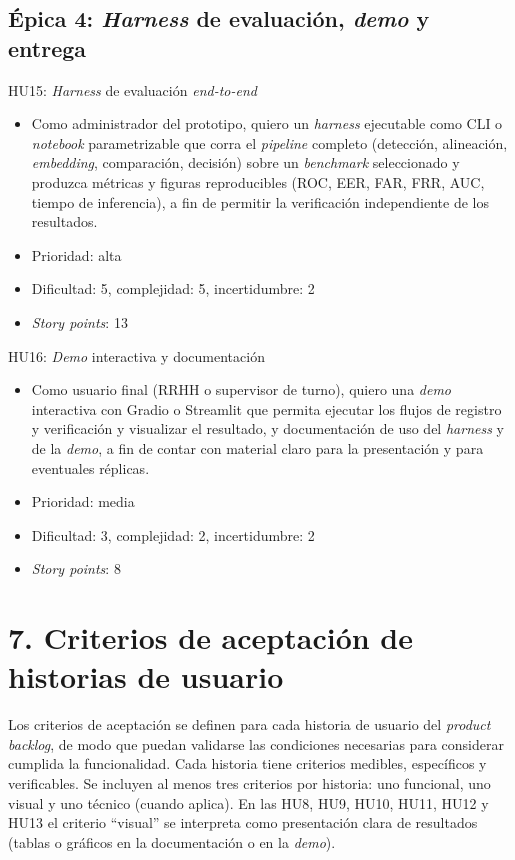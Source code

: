 \documentclass[
  11pt, %
]{charter}
\begin{document}
\subsection{Épica 4: \textit{Harness} de evaluación, \textit{demo} y entrega}

HU15: \textit{Harness} de evaluación \textit{end-to-end}
\begin{itemize}
  \item Como administrador del prototipo, quiero un \textit{harness} ejecutable como CLI o \textit{notebook} parametrizable que corra el \textit{pipeline} completo (detección, alineación, \textit{embedding}, comparación, decisión) sobre un \textit{benchmark} seleccionado y produzca métricas y figuras reproducibles (ROC, EER, FAR, FRR, AUC, tiempo de inferencia), a fin de permitir la verificación independiente de los resultados.
  \item Prioridad: alta
  \item Dificultad: 5, complejidad: 5, incertidumbre: 2
  \item \textit{Story points}: 13
\end{itemize}

HU16: \textit{Demo} interactiva y documentación
\begin{itemize}
  \item Como usuario final (RRHH o supervisor de turno), quiero una \textit{demo} interactiva con Gradio o Streamlit que permita ejecutar los flujos de registro y verificación y visualizar el resultado, y documentación de uso del \textit{harness} y de la \textit{demo}, a fin de contar con material claro para la presentación y para eventuales réplicas.
  \item Prioridad: media
  \item Dificultad: 3, complejidad: 2, incertidumbre: 2
  \item \textit{Story points}: 8
\end{itemize}

\section{7. Criterios de aceptación de historias de usuario}
\label{sec:criteriosAceptacion}

Los criterios de aceptación se definen para cada historia de usuario del \textit{product backlog}, de modo que puedan validarse las condiciones necesarias para considerar cumplida la funcionalidad. Cada historia tiene criterios medibles, específicos y verificables. Se incluyen al menos tres criterios por historia: uno funcional, uno visual y uno técnico (cuando aplica). En las HU8, HU9, HU10, HU11, HU12 y HU13 el criterio ``visual'' se interpreta como presentación clara de resultados (tablas o gráficos en la documentación o en la \textit{demo}).
\end{document}
